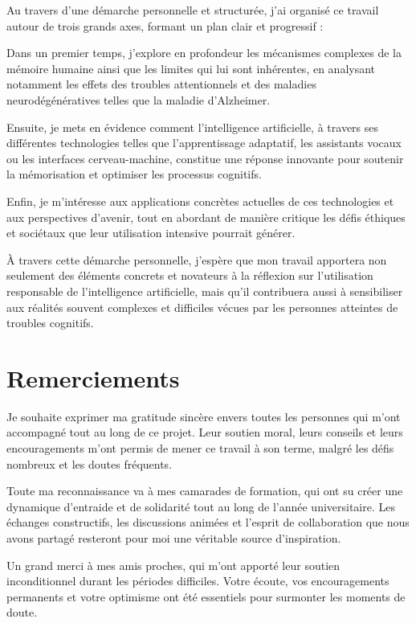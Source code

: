 \documentclass[11pt,a4paper]{report}
\begin{document}
\newpage
Au travers d’une démarche personnelle et structurée, j’ai organisé ce travail autour de trois grands axes, formant un plan clair et progressif :

Dans un premier temps, j’explore en profondeur les mécanismes complexes de la mémoire humaine ainsi que les limites qui lui sont inhérentes, en analysant notamment les effets des troubles attentionnels et des maladies neurodégénératives telles que la maladie d’Alzheimer.

Ensuite, je mets en évidence comment l’intelligence artificielle, à travers ses différentes technologies telles que l’apprentissage adaptatif, les assistants vocaux ou les interfaces cerveau-machine, constitue une réponse innovante pour soutenir la mémorisation et optimiser les processus cognitifs.

Enfin, je m’intéresse aux applications concrètes actuelles de ces technologies et aux perspectives d’avenir, tout en abordant de manière critique les défis éthiques et sociétaux que leur utilisation intensive pourrait générer.

À travers cette démarche personnelle, j’espère que mon travail apportera non seulement des éléments concrets et novateurs à la réflexion sur l’utilisation responsable de l’intelligence artificielle, mais qu’il contribuera aussi à sensibiliser aux réalités souvent complexes et difficiles vécues par les personnes atteintes de troubles cognitifs.


\chapter*{Remerciements}

Je souhaite exprimer ma gratitude sincère envers toutes les personnes qui m’ont accompagné tout au long de ce projet. Leur soutien moral, leurs conseils et leurs encouragements m’ont permis de mener ce travail à son terme, malgré les défis nombreux et les doutes fréquents.

Toute ma reconnaissance va à mes camarades de formation, qui ont su créer une dynamique d’entraide et de solidarité tout au long de l'année universitaire. Les échanges constructifs, les discussions animées et l’esprit de collaboration que nous avons partagé resteront pour moi une véritable source d’inspiration.

Un grand merci à mes amis proches, qui m’ont apporté leur soutien inconditionnel durant les périodes difficiles. Votre écoute, vos encouragements permanents et votre optimisme ont été essentiels pour surmonter les moments de doute.
\end{document}
